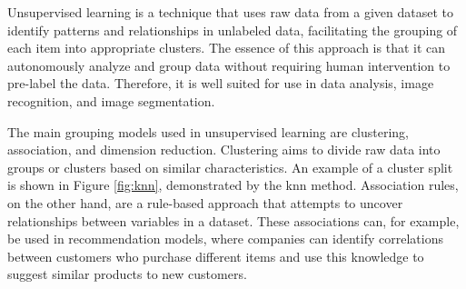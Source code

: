         Unsupervised learning is a technique that uses raw data from a given dataset to identify patterns and relationships in unlabeled data, facilitating the grouping of each item into appropriate clusters. The essence of this approach is that it can autonomously analyze and group data without requiring human intervention to pre-label the data. Therefore, it is well suited for use in data analysis, image recognition, and image segmentation.

        
        
        The main grouping models used in unsupervised learning are clustering, association, and dimension reduction. Clustering aims to divide raw data into groups or clusters based on similar characteristics. An example of a cluster split is shown in Figure \ref{fig:knn}, demonstrated by the \gls{knn} method. Association rules, on the other hand, are a rule-based approach that attempts to uncover relationships between variables in a dataset. These associations can, for example, be used in recommendation models, where companies can identify correlations between customers who purchase different items and use this knowledge to suggest similar products to new customers.

